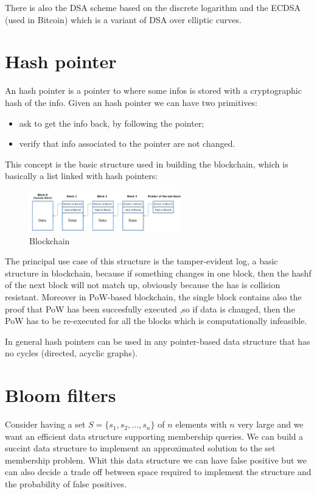 There is also the DSA scheme based on the discrete logarithm and the ECDSA (used in Bitcoin) which is a variant of DSA over elliptic curves.


\section{Hash pointer}
An hash pointer is a pointer to where some infos is stored with a cryptographic hash of the info.
Given an hash pointer we can have two primitives:
\begin{itemize}
    \item ask to get the info back, by following the pointer;
    \item verify that info associated to the pointer are not changed.
\end{itemize}

This concept is the basic structure used in building the blockchain, which is basically a list linked with hash pointers:
\begin{figure}[H]
    \centering
    \includegraphics[width=250px]{images/4_Cryptographic_Toolbox/01.png}
    \caption{Blockchain}
\end{figure}

The principal use case of this structure is the tamper-evident log, a basic structure in blockchain, because if something changes in one block, then the hashf of the next block will not match up, obviously because the has is collision resistant.
Moreover in PoW-based blockchain, the single block contains also the proof that PoW has been succesfully executed ,so if data is changed, then the PoW has to be re-executed for all the blocks which is computationally infeasible.

In general hash pointers can be used in any pointer-based data structure that has no cycles (directed, acyclic graphs).

\section{Bloom filters}
Consider having a set $S = \{ s_1, s_2, ..., s_n \}$ of $n$ elements with $n$ very large and we want an efficient data structure supporting membership queries.
We can build a succint data structure to implement an approximated solution to the set membership problem.
Whit this data structure we can have false positive but we can also decide a trade off between space required to implement the structure and the probability of false positives.

